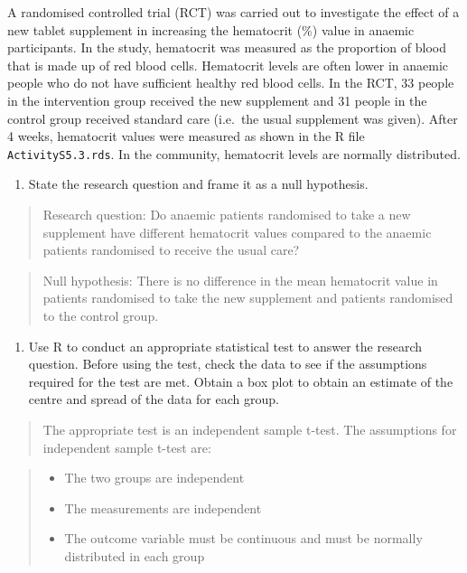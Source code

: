 \documentclass[
]{memoir}
\providecommand{\tightlist}{%
  \setlength{\itemsep}{0pt}\setlength{\parskip}{0pt}}
\begin{document}
A randomised controlled trial (RCT) was carried out to investigate the effect of a new tablet supplement in increasing the hematocrit (\%) value in anaemic participants. In the study, hematocrit was measured as the proportion of blood that is made up of red blood cells. Hematocrit levels are often lower in anaemic people who do not have sufficient healthy red blood cells. In the RCT, 33 people in the intervention group received the new supplement and 31 people in the control group received standard care (i.e.~the usual supplement was given). After 4 weeks, hematocrit values were measured as shown in the R file \texttt{ActivityS5.3.rds}. In the community, hematocrit levels are normally distributed.

\begin{enumerate}
\def\labelenumi{\alph{enumi})}
\tightlist
\item
  State the research question and frame it as a null hypothesis.
\end{enumerate}

\begin{quote}
Research question: Do anaemic patients randomised to take a new supplement have different hematocrit values compared to the anaemic patients randomised to receive the usual care?
\end{quote}

\begin{quote}
Null hypothesis: There is no difference in the mean hematocrit value in patients randomised to take the new supplement and patients randomised to the control group.
\end{quote}

\begin{enumerate}
\def\labelenumi{\alph{enumi})}
\setcounter{enumi}{1}
\tightlist
\item
  Use R to conduct an appropriate statistical test to answer the research question. Before using the test, check the data to see if the assumptions required for the test are met. Obtain a box plot to obtain an estimate of the centre and spread of the data for each group.
\end{enumerate}

\begin{quote}
The appropriate test is an independent sample t-test. The assumptions for independent sample t-test are:
\end{quote}

\begin{quote}
\begin{itemize}
\tightlist
\item
  The two groups are independent
\item
  The measurements are independent
\item
  The outcome variable must be continuous and must be normally distributed in each group
\end{itemize}
\end{quote}
\end{document}
